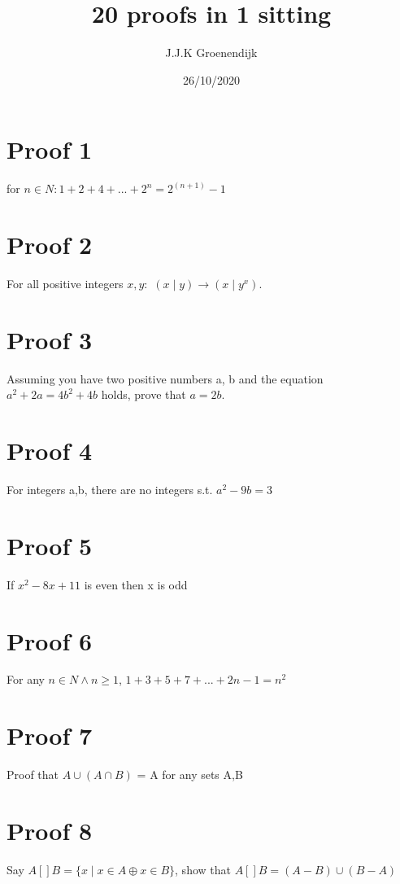 \documentclass{article}
\title{20 proofs in 1 sitting}
\author{J.J.K Groenendijk}
\date{26/10/2020}
\begin{document}
\section{Proof 1}
for $n \in N: 1+2+4+...+2^n = 2^{(n+1)}-1$\\


\section{Proof 2}
For all positive integers $x, y:$  $ (x\mid y) \rightarrow (x \mid y^x)$.\\

\section{Proof 3}


Assuming you have two positive numbers a, b and the equation $a^2 + 2a = 4b^2 + 4b$ holds, prove that $a = 2b$.\\



\section{Proof 4}
For integers a,b, there are no integers s.t. $a^2-9b=3$\\

\section{Proof 5}
If $x^2-8x+11$ is even then x is odd\\

\section{Proof 6}

For any $n \in N \land n \geq 1$, $1+3+5+7+...+2n-1 = n^2$\\


\section{Proof 7}
Proof that $A \cup (A \cap B)$ = A for any sets A,B\\


\section{Proof 8}
Say $A [] B = \{x \mid x \in A \oplus x \in B\}$, show that $A [] B = (A - B) \cup (B - A)$\\
\end{document}
